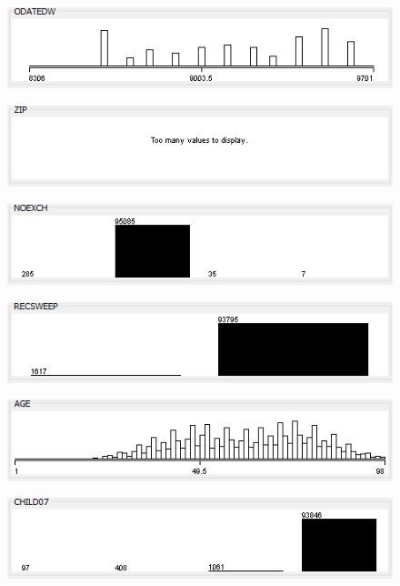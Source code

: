 \begin{figure}
\includegraphics{./images/expl_rep/Cattura-00-00}
\end{figure}
\begin{figure}
\includegraphics{./images/expl_rep/Cattura-00-01}
\end{figure}
\begin{figure}
\includegraphics{./images/expl_rep/Cattura-00-02}
\end{figure}
\begin{figure}
\includegraphics{./images/expl_rep/Cattura-00-03}
\end{figure}
\begin{figure}
\includegraphics{./images/expl_rep/Cattura-00-04}
\end{figure}
\begin{figure}
\includegraphics{./images/expl_rep/Cattura-00-05}
\end{figure}
